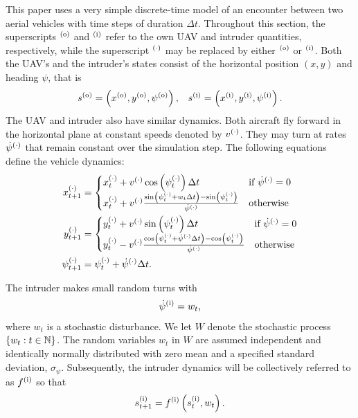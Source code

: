 This paper uses a very simple discrete-time model of an encounter between two aerial vehicles with time steps of duration $\Delta t$. Throughout this section, the superscripts $^{(\mathrm{o})}$ and $^{(\mathrm{i})}$ refer to the own UAV and intruder quantities, respectively, while the superscript $^{(\cdot)}$ may be replaced by either $^{(\mathrm{o})}$ or $^{(\mathrm{i})}$. Both the UAV's and the intruder's states consist of the horizontal position $(x,y)$ and heading $\psi$, that is
\begin{equation}
    s^{(\mathrm{o})} = \left(x^{(\mathrm{o})}, y^{(\mathrm{o})}, \psi^{(\mathrm{o})} \right)\text{,} \quad 
    s^{(\mathrm{i})} = \left(x^{(\mathrm{i})}, y^{(\mathrm{i})}, \psi^{(\mathrm{i})} \right)\text{.}
\end{equation}
The UAV and intruder also have similar dynamics. Both aircraft fly forward in the horizontal plane at constant speeds denoted by $v^{(\cdot)}$. They may turn at rates $\dot{\psi}^{(\cdot)}$ that remain constant over the simulation step. The following equations define the vehicle dynamics: 
\begin{align*}
    x^{(\cdot)}_{t+1} &= \begin{cases}
        x^{(\cdot)}_{t} + v^{(\cdot)} \cos\left(\psi^{(\cdot)}_t\right)\Delta t & \text{if } \dot{\psi}^{(\cdot)} = 0 \\
        x^{(\cdot)}_{t} + v^{(\cdot)} \frac{\sin\left( \psi^{(\cdot)}_t + w_t\Delta t \right) - \sin\left( \psi^{(\cdot)}_t \right)}{\dot{\psi}^{(\cdot)}} & \text{otherwise}\\
    \end{cases} \\
    y^{(\cdot)}_{t+1} &= \begin{cases}
        y^{(\cdot)}_{t} + v^{(\cdot)} \sin\left(\psi^{(\cdot)}_t\right)\Delta t & \text{if } \dot{\psi}^{(\cdot)} = 0 \\
        y^{(\cdot)}_{t} - v^{(\cdot)} \frac{\cos\left(\psi^{(\cdot)}_t + \dot{\psi}^{(\cdot)}\Delta t\right) - \cos\left(\psi^{(\cdot)}_t\right)}{\dot{\psi}^{(\cdot)}} & \text{otherwise}\\
    \end{cases} \\
    \psi^{(\cdot)}_{t+1} &= \psi^{(\cdot)}_t + \dot{\psi}^{(\cdot)} \Delta t \text{.}
\end{align*}

The intruder makes small random turns with
\begin{equation}
    \dot{\psi}^{(\mathrm{i})} = w_t \text{,}
\end{equation}
where $w_t$ is a stochastic disturbance. We let $W$ denote the stochastic process $\{w_t: t\in {\mathbb{N}}\}$. The random variables $w_t$ in $W$ are assumed independent and identically normally distributed with zero mean and a specified standard deviation, $\sigma_{\dot{\psi}}$. Subsequently, the intruder dynamics will be collectively referred to as $f^{(\mathrm{i})}$ so that
\begin{equation} \label{eq:idyn}
    s_{t+1}^{(\mathrm{i})} = f^{(\mathrm{i})}\left(s^{(\mathrm{i})}_t, w_t\right) \text{.}
\end{equation}


